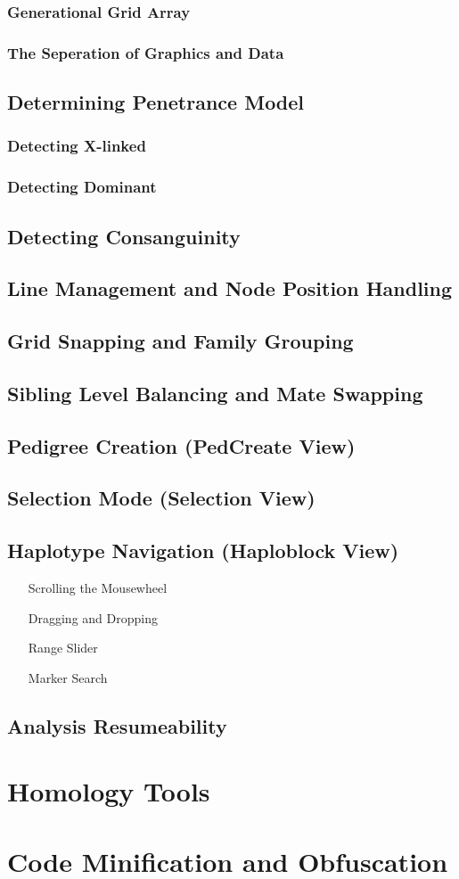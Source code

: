 \subsubsection{Generational Grid Array}
\subsubsection{The Seperation of Graphics and Data}

\subsection{Determining Penetrance Model}
\subsubsection{Detecting X-linked}
\subsubsection{Detecting Dominant}

\subsection{Detecting Consanguinity}
\subsection{Line Management and Node Position Handling}
\subsection{Grid Snapping and Family Grouping}
\subsection{Sibling Level Balancing and Mate Swapping}
\subsection{Pedigree Creation (PedCreate View)}
\subsection{Selection Mode (Selection View)}
\subsection{Haplotype Navigation (Haploblock View)}
\begin{enumerate}
\item[Scrolling the Mousewheel]{}
\item[Dragging and Dropping]{}
\item[Range Slider]{}
\item[Marker Search]{}
\end{enumerate}

\subsection{Analysis Resumeability}


\section{Homology Tools}
\section{Code Minification and Obfuscation}